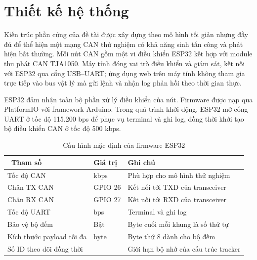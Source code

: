 \chapter{Thiết kế hệ thống}


Kiến trúc phần cứng của đề tài được xây dựng theo mô hình tối giản nhưng đầy đủ
để thể hiện một mạng CAN thử nghiệm có khả năng sinh tấn công và phát hiện bất
thường. Mỗi nút CAN gồm một vi điều khiển ESP32 kết hợp với module thu phát CAN
TJA1050. Máy tính đóng vai trò điều khiển và giám sát, kết nối với ESP32 qua cổng
USB--UART; ứng dụng web trên máy tính không tham gia trực tiếp vào bus vật lý mà
gửi lệnh và nhận log phản hồi theo thời gian thực.


ESP32 đảm nhận toàn bộ phần xử lý điều khiển của nút. Firmware được nạp qua
PlatformIO với framework Arduino. Trong quá trình khởi động, ESP32 mở cổng UART
ở tốc độ 115.200 bps để phục vụ terminal và ghi log, đồng thời khởi tạo bộ điều
khiển CAN ở tốc độ 500 kbps.


\begin{table}[H]
\centering
\begin{tabular}{|>{\raggedright\arraybackslash}p{5cm}|>{\raggedright\arraybackslash}p{3cm}|>{\raggedright\arraybackslash}p{5.5cm}|}
\hline
\rowcolor{red!20}\
\textbf{Tham số} & \textbf{Giá trị} & \textbf{Ghi chú} \\ \hline
Tốc độ CAN & 500 kbps & Phù hợp cho mô hình thử nghiệm \\ \hline
Chân TX CAN & GPIO 26 & Kết nối tới TXD của transceiver \\ \hline
Chân RX CAN & GPIO 27 & Kết nối tới RXD của transceiver \\ \hline
Tốc độ UART & 115.200 bps & Terminal và ghi log \\ \hline
Bảo vệ bộ đếm & Bật & Byte cuối mỗi khung là số thứ tự \\ \hline
Kích thước payload tối đa & 7 byte & Byte thứ 8 dành cho bộ đếm \\ \hline
Số ID theo dõi đồng thời & 16 & Giới hạn bộ nhớ của cấu trúc tracker \\ \hline
\end{tabular}
\caption{Cấu hình mặc định của firmware ESP32}
\end{table}


